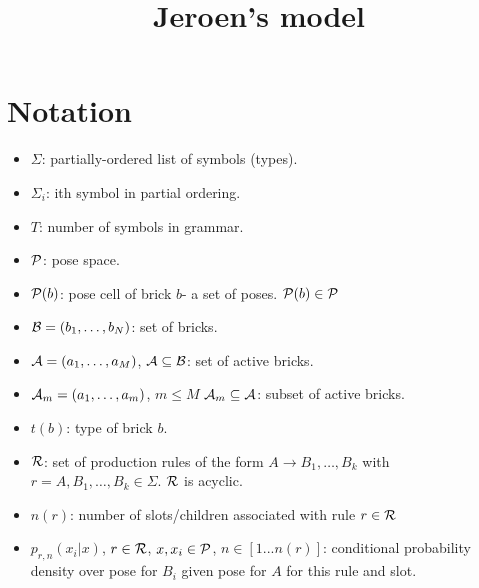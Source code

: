 \documentclass[11pt]{article}
\newcommand{\Pose}{{\cal P}}
\newcommand{\A}{{\cal A}}
\newcommand{\symb}{\Sigma}
\newcommand{\B}{\cal B}
\newcommand{\Am}{\A_{m}}
\begin{document}
\title{Jeroen's model}
\maketitle

\section{Notation}

\begin{itemize}

\item $\symb$: partially-ordered list of symbols (types).

\item $\symb_i$: ith symbol in partial ordering.

\item $T$: number of symbols in grammar.

\item $\Pose$: pose space.

\item $\Pose(b)$: pose cell of brick $b$- a set of poses. $\Pose(b) \in \Pose$ 

\item ${\B} = (b_1,\ldots,b_N)$: set of bricks.

\item $\A = (a_1,\ldots,a_M)$, $\A \subseteq {\B}$: set of active bricks.

\item $\Am = (a_1,\ldots,a_m)$, $m \leq M$ $\Am \subseteq {\A}$: subset of active bricks.

\item $t(b)$: type of brick $b$.

\item ${\cal R}$: set of production rules of the form
$A \rightarrow B_1,\ldots,B_k$ with $r = A,B_1,\ldots,B_k \in \Sigma$. ${\cal R}$ is acyclic.

\item $n(r)$: number of slots/children associated with rule $r \in {\cal R}$


\item $p_{r,n}(x_i|x)$, $r \in {\cal R}$, $x,x_i \in {\cal P}$, $n \in [1...n(r)]$: 
conditional probability density over pose for $B_i$ given pose for $A$ for this rule and slot.


\end{itemize}
\end{document}
